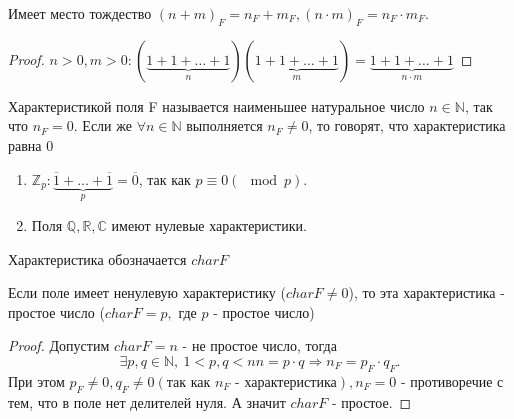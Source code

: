 \begin{proposition}
	Имеет место тождество \((n+m)_F = n_F+m_F, (n\cdot m)_F = n_F\cdot m_F\).
\end{proposition}
\begin{proof}
	\(n>0, m >0: (\underbrace{1+1+\ldots+1}_n)(\underbrace{1+1+\ldots+1}_m) = \underbrace{1+1+\ldots+1}_{n\cdot m}\)
\end{proof}
\begin{definition}
	Характеристикой поля F называется наименьшее натуральное число \(n\in \mathbb{N}\), так что \(n_F = 0\). Если же \(\forall n\in\mathbb{N} \text{ выполняется } n_F\ne0\), то говорят, что характеристика равна 0
\end{definition}
\begin{example}
	\begin{enumerate}
			\item\(\mathbb{Z}_p: \underbrace{\overline 1 + \ldots + \overline 1}_{p} = \overline 0\), так как \(p\equiv 0(\mod p)\).
			\item Поля \(\mathbb{Q}, \mathbb{R}, \mathbb{C}\) имеют нулевые характеристики.
	\end{enumerate}
	Характеристика обозначается \(char F\)
\end{example}
\begin{proposition}
	Если поле имеет ненулевую характеристику (\(char F\ne0\)), то эта характеристика - простое число  (\(char F = p, \text{ где $p$ - простое число}\))
\end{proposition}
\begin{proof}
	Допустим \(char F = n\) - не простое число, тогда \[\exists p, q \in \mathbb{N}, \> 1 < p, q < n  n = p\cdot q \Longrightarrow n_F = p_F\cdot q_F.\] 
	При этом \(p_F\ne 0, q_F\ne 0(\text{так как $n_F$ - характеристика}), n_F = 0\) - противоречие с тем, что в поле нет делителей нуля. А значит \(char F \) - простое.
 \end{proof}

